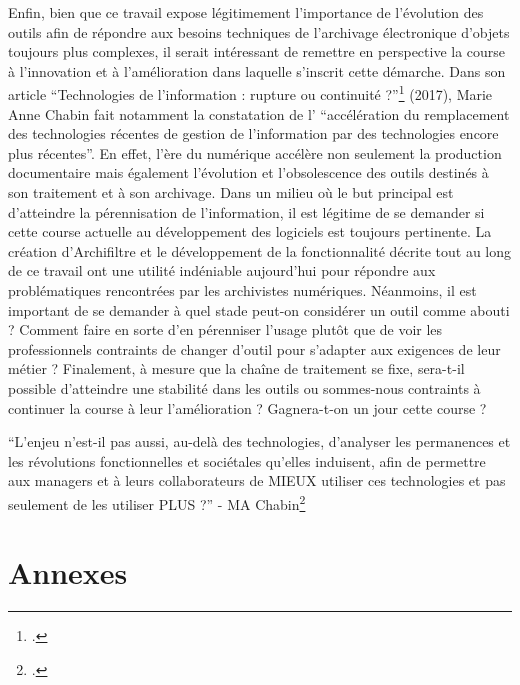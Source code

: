 \documentclass[a4paper,12pt,twoside]{book}
\begin{document}
	
	Enfin, bien que ce travail expose légitimement l’importance de l’évolution des outils afin de répondre aux besoins techniques de l’archivage électronique d’objets toujours plus complexes, il serait intéressant de remettre en perspective la course à l’innovation et à l’amélioration dans laquelle s’inscrit cette démarche. Dans son article \enquote{Technologies de l’information : rupture ou continuité ?}\footcite{chabin_technologies_2017} (2017), Marie Anne Chabin fait notamment la constatation de l’ \enquote{accélération du remplacement des technologies récentes de gestion de l’information par des technologies encore plus récentes}. En effet, l’ère du numérique accélère non seulement la production documentaire mais également l’évolution et l’obsolescence des outils destinés à son traitement et à son archivage. Dans un milieu où le but principal est d’atteindre la pérennisation de l’information, il est légitime de se demander si cette course actuelle au développement des logiciels est toujours pertinente. La création d’Archifiltre et le développement de la fonctionnalité décrite tout au long de ce travail ont une utilité indéniable aujourd’hui pour répondre aux problématiques rencontrées par les archivistes numériques. Néanmoins, il est important de se demander à quel stade peut-on considérer un outil comme abouti ? Comment faire en sorte d’en pérenniser l’usage plutôt que de voir les professionnels contraints de changer d’outil pour s’adapter aux exigences de leur métier ? Finalement, à mesure que la chaîne de traitement se fixe, sera-t-il possible d’atteindre une stabilité dans les outils ou sommes-nous contraints à continuer la course à leur l’amélioration ? Gagnera-t-on un jour cette course ? 
	
	
	\enquote{L’enjeu n’est-il pas aussi, au-delà des technologies, d’analyser les permanences et les révolutions fonctionnelles et sociétales qu’elles induisent, afin de permettre aux managers et à leurs collaborateurs de MIEUX utiliser ces technologies et pas seulement de les utiliser PLUS ?} - MA Chabin\footcite{chabin_technologies_2017}
	
\newpage{\pagestyle{empty}\cleardoublepage}
	







\appendix %
	
	\part*{Annexes}	
	
\end{document}
